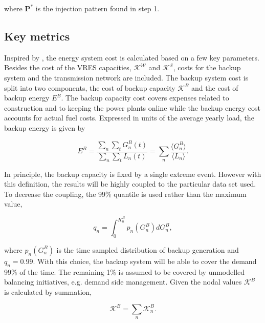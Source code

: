 \documentclass[a4paper, 5p, sort&compress]{elsarticle}%
\begin{document}
where $\mathbf{P}^{*}$ is the injection pattern found in step 1.


\subsection{Key metrics}

Inspired by \cite{Sensitivity}, the energy system cost is calculated
based on a few key parameters. Besides the cost of the VRES
capacities, $\mathcal{K^{W}}$ and $\mathcal{K^S}$, costs for the
backup system and the transmission network are included. The backup
system cost is split into two components, the cost of backup capacity
$\mathcal{K}^{B}$ and the cost of backup energy $E^{B}$. The backup
capacity cost covers expenses related to construction and to keeping
the power plants online while the backup energy cost accounts for
actual fuel costs. Expressed in units of the average yearly load, the
backup energy is given by

\begin{equation}
  \label{eq:backup-energy}
  E^{B} =\frac{\sum_{n} \sum_{t} G^{B}_{n}(t)}{\sum_{n} \sum_{t}
    L_{n}(t)} = \sum_{n} \frac{\langle G^{B}_{n} \rangle}{\langle L_{n}
    \rangle} .
\end{equation}

In principle, the backup capacity is fixed by a single extreme
event. However with this definition, the results will be highly
coupled to the particular data set used. To decrease the coupling, the
99\% quantile is used rather than the maximum value,

\begin{equation}
  \label{eq:2}
  q_{n} = \int _{0} ^{K_{n}^{B}} p_{n}(G^{B}_{n})dG^{B}_{n},
\end{equation}

where $p_{n}(G^{B}_{n})$ is the time sampled distribution of backup
generation and $q_{n} = 0.99$. With this choice, the backup system
will be able to cover the demand 99\% of the time. The remaining 1\%
is assumed to be covered by unmodelled balancing initiatives,
e.g. demand side management. Given the nodal values $\mathcal{K}^{B}$
is calculated by summation,

\begin{equation}
  \label{eq:4}
  \mathcal{K}^{B} = \sum_{n} \mathcal{K}^{B}_{n} .
\end{equation}
\end{document}
